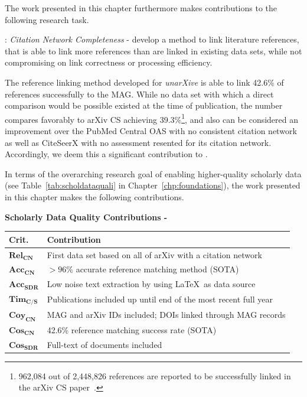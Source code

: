 The work presented in this chapter furthermore makes contributions to the following research task.

\begin{rtlist}
    \item[\rtmark{2}:] \textit{Citation Network Completeness} - develop a method to link literature references, that is able to link more references than are linked in existing data sets, while not compromising on link correctness or processing efficiency.
\end{rtlist}


The reference linking method developed for \emph{unarXive} is able to link 42.6\% of references successfully to the MAG. While no data set with which a direct comparison would be possible existed at the time of publication, the number compares favorably to arXiv CS achieving 39.3\%\footnote{962,084 out of 2,448,826 references are reported to be successfully linked in the arXiv CS paper~\cite{Faerber2018LREC}.}, and also can be considered an improvement over the PubMed Central OAS with no consistent citation network as well as CiteSeerX with no assessment resented for its citation network. Accordingly, we deem this a significant contribution to .

In terms of the overarching research goal of enabling higher-quality scholarly data (see Table~\ref{tab:scholdataquali} in Chapter~\ref{chp:foundations}), the work presented in this chapter makes the following contributions.

\begin{infobox-progress}
      \textbf{Scholarly Data Quality Contributions - \cite{Saier2020}}\vspace{0.5em}

      \begin{tabular}{lp{10.9cm}}
        \toprule
        Crit. & Contribution \\
        \midrule
        $\mathbf{Rel_{CN}}$ & First data set based on all of arXiv with a citation network \\
        $\mathbf{Acc_{CN}}$ & $>96$\% accurate reference matching method (SOTA) \\
        $\mathbf{Acc_{SDR}}$ & Low noise text extraction by using \LaTeX\ as data source \\
        $\mathbf{Tim_{C/S}}$ & Publications included up until end of the most recent full year \\
        $\mathbf{Coy_{CN}}$ & MAG and arXiv IDs included; DOIs linked through MAG records \\
        $\mathbf{Cos_{CN}}$ & 42.6\% reference matching success rate (SOTA) \\
        $\mathbf{Cos_{SDR}}$ & Full-text of documents included \\
        \bottomrule
      \end{tabular}
\end{infobox-progress}

